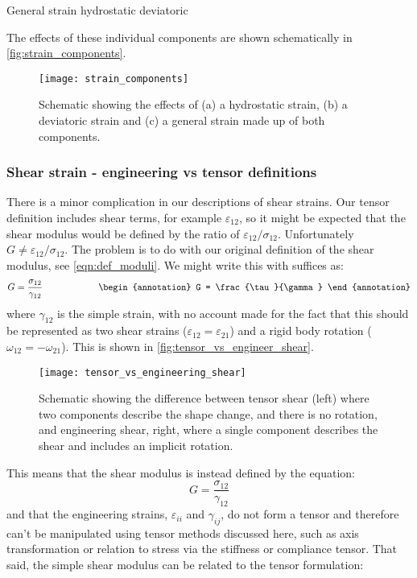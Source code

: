 \begin{annotation}
\qquad\qquad General strain \qquad\quad hydrostatic \qquad\qquad\qquad\qquad deviatoric
\end{annotation}

The effects of these individual components are shown schematically in \autoref{fig:strain_components}.
\begin{figure}
\centering
\texttt{[image: strain\_components]}
\caption{Schematic showing the effects of (a) a hydrostatic strain, (b) a deviatoric strain and (c) a general strain made up of both components.\label{fig:strain_components}}
\end{figure}


\subsubsection{Shear strain - engineering vs tensor definitions}

There is a minor complication in our descriptions of shear strains. Our tensor definition includes shear terms, for example $\varepsilon_{12}$, so it might be expected that the shear modulus would be defined by the ratio of $\varepsilon_{12}/\sigma_{12}$. Unfortunately $G\neq \varepsilon_{12}/\sigma_{12}$. The problem is to do with our original definition of the shear modulus, see \autoref{eqn:def_moduli}. We might write this with suffices as:
\begin{equation}
G=\frac{\sigma_{12}}{\gamma_{12}} \qquad \qquad \qquad \begin{annotation}
G = \frac{\tau}{\gamma}
\end{annotation}
\end{equation}
where $\gamma_{12}$ is the simple strain, with  no account made for the fact that this should be represented as two shear strains ($\varepsilon_{12}=\varepsilon_{21}$) and a rigid body rotation ($\omega_{12}=-\omega_{21}$). This is shown in \autoref{fig:tensor_vs_engineer_shear}.
\FloatBarrier
\begin{figure}
\centering
\texttt{[image: tensor\_vs\_engineering\_shear]}
\caption{Schematic showing the difference between tensor shear (left) where two components describe the shape change, and there is no rotation, and engineering shear, right, where a single component describes the shear and includes an implicit rotation.\label{fig:tensor_vs_engineer_shear}}
\end{figure}
\FloatBarrier
This means that the shear modulus is instead defined by the equation:
\begin{equation}
G=\frac{\sigma_{12}}{\gamma_{12}}
\end{equation}
and that the engineering strains, $\varepsilon_{ii}$ and $\gamma_{ij}$, do not form a tensor and therefore can't be manipulated using tensor methods discussed here, such as axis transformation or relation to stress via the stiffness or compliance tensor. That said, the simple shear modulus can be related to the tensor formulation:

